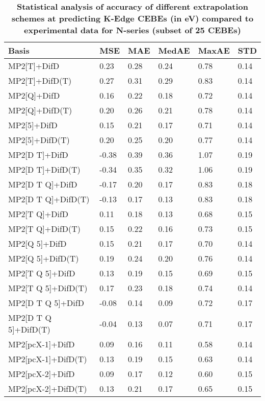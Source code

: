 \begin{table}
  \caption{\textbf{Statistical analysis of accuracy of different extrapolation schemes at predicting K-Edge CEBEs (in eV) compared to experimental data for N-series (subset of 25 CEBEs)}}
  \begin{tabular}{l l l l l l }
    \toprule
    \textbf{Basis} & \textbf{MSE} & \textbf{MAE} & \textbf{MedAE} & \textbf{MaxAE} & \textbf{STD} \\ 
    \midrule
    MP2[T]+DifD & 0.23 & 0.28 & 0.24 & 0.78 & 0.14 \\ 
    MP2[T]+DifD(T) & 0.27 & 0.31 & 0.29 & 0.83 & 0.14 \\ 
    MP2[Q]+DifD & 0.16 & 0.22 & 0.18 & 0.72 & 0.14 \\ 
    MP2[Q]+DifD(T) & 0.20 & 0.26 & 0.21 & 0.78 & 0.14 \\ 
    MP2[5]+DifD & 0.15 & 0.21 & 0.17 & 0.71 & 0.14 \\ 
    MP2[5]+DifD(T) & 0.20 & 0.25 & 0.20 & 0.77 & 0.14 \\ 
    MP2[D T]+DifD & -0.38 & 0.39 & 0.36 & 1.07 & 0.19 \\ 
    MP2[D T]+DifD(T) & -0.34 & 0.35 & 0.32 & 1.06 & 0.19 \\ 
    MP2[D T Q]+DifD & -0.17 & 0.20 & 0.17 & 0.83 & 0.18 \\ 
    MP2[D T Q]+DifD(T) & -0.13 & 0.17 & 0.13 & 0.83 & 0.18 \\ 
    MP2[T Q]+DifD & 0.11 & 0.18 & 0.13 & 0.68 & 0.15 \\ 
    MP2[T Q]+DifD(T) & 0.15 & 0.22 & 0.16 & 0.73 & 0.15 \\ 
    MP2[Q 5]+DifD & 0.15 & 0.21 & 0.17 & 0.70 & 0.14 \\ 
    MP2[Q 5]+DifD(T) & 0.19 & 0.24 & 0.20 & 0.76 & 0.14 \\ 
    MP2[T Q 5]+DifD & 0.13 & 0.19 & 0.15 & 0.69 & 0.15 \\ 
    MP2[T Q 5]+DifD(T) & 0.17 & 0.23 & 0.18 & 0.74 & 0.14 \\ 
    MP2[D T Q 5]+DifD & -0.08 & 0.14 & 0.09 & 0.72 & 0.17 \\ 
    MP2[D T Q 5]+DifD(T) & -0.04 & 0.13 & 0.07 & 0.71 & 0.17 \\ 
    MP2[pcX-1]+DifD & 0.09 & 0.16 & 0.11 & 0.58 & 0.14 \\ 
    MP2[pcX-1]+DifD(T) & 0.13 & 0.19 & 0.15 & 0.63 & 0.14 \\ 
    MP2[pcX-2]+DifD & 0.09 & 0.17 & 0.12 & 0.60 & 0.15 \\ 
    MP2[pcX-2]+DifD(T) & 0.13 & 0.21 & 0.17 & 0.65 & 0.15 \\ 

\end{tabular}
\end{table}
